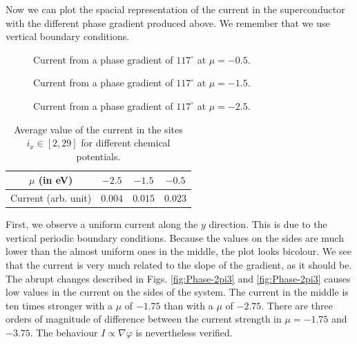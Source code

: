 \documentclass[..\main.tex]{subfile}
\begin{document}
Now we can plot the spacial representation of the current in the superconductor with the different phase gradient produced above. We remember
that we use vertical boundary conditions.
\begin{figure}[H]
    
    \caption{Current from a phase gradient of $117^{\circ}$ at $\mu = -0.5$.}
\end{figure}
\begin{figure}[H]
    
    \caption{Current from a phase gradient of $117^{\circ}$ at $\mu = -1.5$.}
\end{figure}
\begin{figure}[H]
    
    \caption{Current from a phase gradient of $117^{\circ}$ at $\mu = -2.5$.}
\end{figure}
\begin{table}[H]
    \centering
    \begin{tabular}{c||c|c|c}
        $\mu$ (in \si{\electronvolt}) & $-2.5$ & $-1.5$ & $-0.5$\\\hline
        Current (arb. unit)& $0.004$ & $0.015$ & $0.023$\\
    \end{tabular}
    \caption{Average value of the current in the sites $i_x\in[2,29]$ for different chemical potentials.}
\end{table}
First, we observe a uniform current along the $y$ direction. This is due to the vertical periodic boundary conditions.
Because the values on the sides are much lower than the almost uniform ones in the middle, the plot looks bicolour.
We see that the current is very much related to the slope of the gradient, as it should be. 
The abrupt changes described in Figs. \ref{fig:Phase-2pi3} and \ref{fig:Phase-2pi3} causes low values in the current on the sides of the system. 
The current in the middle is ten times stronger with a $\mu$ of $-1.75$ than with a $\mu$ of $-2.75$. There are three orders of magnitude
of difference between the current strength in $\mu = -1.75$ and $-3.75$. The behaviour $I\propto\nabla\varphi$ \cite{Orlando2003} is nevertheless verified.\\
\end{document}
